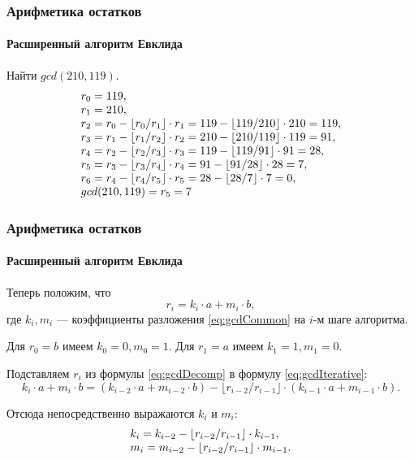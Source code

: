 \begin{frame}
    \frametitle{Арифметика остатков}
    \framesubtitle{Расширенный алгоритм Евклида}
    
    \begin{example}
        Найти $gcd(210, 119)$.
        \[
        \begin{array}[c]{l}
        r_0=119,\\
        r_1=210,\\
        r_2=r_0 - \lfloor r_0/r_1\rfloor\cdot r_1=119-\lfloor 119/210\rfloor\cdot 210=119,\\
        r_3=r_{1} - \lfloor r_{1}/r_{2}\rfloor\cdot r_{2}=210-\lfloor 210/119\rfloor\cdot 119=91,\\
        r_4=r_{2} - \lfloor r_{2}/r_{3}\rfloor\cdot r_{3}=119-\lfloor 119/91\rfloor\cdot 91=28,\\
        r_5=r_{3} - \lfloor r_{3}/r_{4}\rfloor\cdot r_{4}=91-\lfloor 91/28\rfloor\cdot 28=7,\\
        r_6=r_{4} - \lfloor r_{4}/r_{5}\rfloor\cdot r_{5}=28-\lfloor 28/7\rfloor\cdot 7=0,\\
        gcd(210, 119)=r_5=7
        \end{array}
        \]
    \end{example}
\end{frame}


\begin{frame}
    \frametitle{Арифметика остатков}
    \framesubtitle{Расширенный алгоритм Евклида}
    
    Теперь положим, что 
    \begin{equation}\label{eq:gcdDecomp}
        r_i=k_i\cdot a + m_i\cdot b,
    \end{equation}
    где $k_i,m_i$ --- коэффициенты разложения  \eqref{eq:gcdCommon} на $i$-м шаге алгоритма.

    Для $r_0=b$ имеем $k_0=0, m_0=1$. Для $r_1=a$ имеем $k_1=1, m_1=0$.

    Подставляем $r_i$ из формулы \eqref{eq:gcdDecomp} в формулу \eqref{eq:gcdIterative}:
    \[
    k_i\cdot a + m_i\cdot b=(k_{i-2}\cdot a + m_{i-2}\cdot b) - \lfloor r_{i-2}/r_{i-1}\rfloor\cdot (k_{i-1}\cdot a + m_{i-1}\cdot b).
    \]

    Отсюда непосредственно выражаются $k_i$ и $m_i$:
    \[
    \begin{array}[c]{l}
    k_i=k_{i-2}-\lfloor r_{i-2}/r_{i-1}\rfloor\cdot k_{i-1},\\
    m_i=m_{i-2}-\lfloor r_{i-2}/r_{i-1}\rfloor\cdot m_{i-1}.
    \end{array}
    \]
\end{frame}


